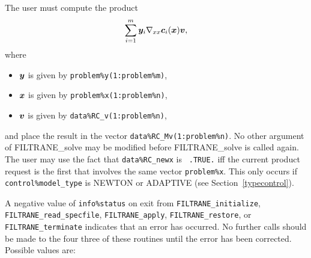 \documentclass{galahad}
\newcommand{\packagename}{FILTRANE}
\newcommand{\sym}{\sf\small}
\begin{document}
\begin{description}
 The user must compute the product
\[
     \sum_{i=1}^m {\bm{y}}_i \nabla_{xx} {\bm{c}}_i( {\bm{x}} ) {\bm{v}},
\]
where 
\begin{itemize}
\item ${\bm{y}}$ is given by {\tt problem\%y(1:problem\%m)},
\item ${\bm{x}}$ is given by {\tt problem\%x(1:problem\%n)},
\item ${\bm{v}}$ is given by {\tt data\%RC\_v(1:problem\%n)},
\end{itemize}
and place the result in the vector {\tt data\%RC\_Mv(1:problem\%n)}. No other
argument of \packagename\_solve may be modified before \packagename\_solve 
is called again. The user may use the fact that {\tt data\%RC\_newx} is {\tt
.TRUE.} iff the current product request is the first that involves the same
vector {\tt problem\%x}. This only occurs if {\tt control\%model\_type} is
{\sym NEWTON} or {\sym ADAPTIVE}
(see Section~\ref{typecontrol}).
\end{description} 


\galerrors
A negative value of {\tt info\%status} on exit from 
{\tt \packagename\_initialize},
{\tt \packagename\_read\_specfile},
{\tt \packagename\_apply},
{\tt \packagename\_restore},
or 
{\tt \packagename\_terminate}
indicates that an error has occurred. No further calls should be made
to the four three of these routines until the error has been
corrected. Possible values are:
\end{document}
